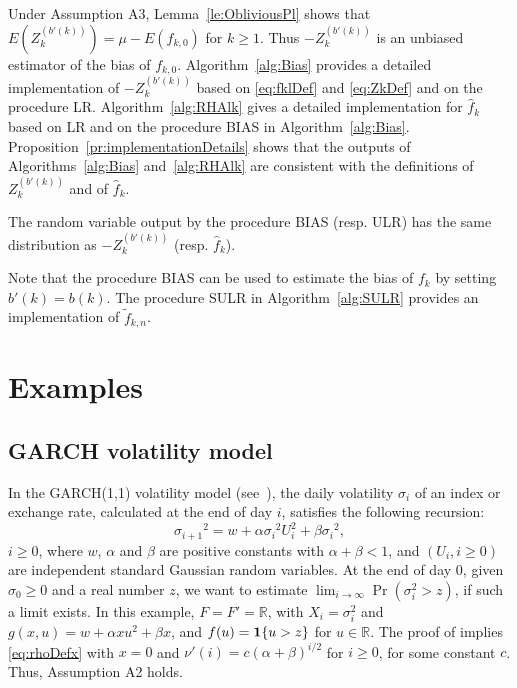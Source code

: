 \documentclass[a4paper,11pt]{article}
\begin{document}
Under Assumption A3, Lemma~\ref{le:ObliviousPl} shows that   \(E(Z_{k}^{(b'(k))})=\mu-E(f_{k,0})\) for  \(k\geq1\). Thus \(-Z_{k}^{(b'(k))}\) is an unbiased estimator of the bias of \(f_{k,0}\).  Algorithm~\ref{alg:Bias}   
provides a detailed implementation of \(-Z_{k}^{(b'(k))}\) based on \eqref{eq:fklDef} and \eqref{eq:ZkDef} and on  the procedure LR. Algorithm~\ref{alg:RHAlk} gives a detailed implementation for  \(\hat f_{k}\) based on LR and on the procedure BIAS in  Algorithm~\ref{alg:Bias}.   Proposition~\ref{pr:implementationDetails} shows that  the outputs of Algorithms~\ref{alg:Bias}   
 and~\ref{alg:RHAlk} are consistent with the definitions of \(Z_{k}^{(b'(k))}\) and of  \(\hat f_{k}\).     
\begin{proposition}\label{pr:implementationDetails}The random variable output by the procedure BIAS (resp. ULR) has the same distribution as  \(-Z_{k}^{(b'(k))}\) (resp. \(\hat f_{k}\)).  
\end{proposition}
Note that the procedure BIAS can be used to estimate the bias of \(f_{k}\) by setting \(b'(k)=b(k)\). The procedure SULR in Algorithm~\ref{alg:SULR} provides an implementation of \(\tilde f_{k,n}\).

\section{Examples}\label{se:examples}
\subsection{GARCH volatility model}\label{sub:GARCH}
In the  GARCH(1,1) volatility model (see~\citep[Ch. 23]{Hull14}), the daily volatility  \(\sigma_{i}\)  of an index or exchange rate, calculated at the end of day  \(i\), satisfies the following recursion:
\begin{equation*}
{\sigma_{i+1}}^{2}= w +\alpha{\sigma_{i}}^{2}U_{i}^{2}+\beta {\sigma_{i}}^{2},
\end{equation*}
 \(i\geq0\), where \( w \), \(\alpha\) and \(\beta\) are positive constants with \(\alpha+\beta<1\), and \((U_{i}, i\geq0)\) are independent standard Gaussian random variables.  At the end of day \(0\), given  \(\sigma_{0}\geq0\) and a real number \(z\), we want to estimate \(\lim_{i\rightarrow\infty}\Pr(\sigma_{i}^{2}> z)\), if such a limit exists. In this example, \(F=F'=\mathbb{R}\), with \(X_{i}=\sigma_{i}^{2}\) and \(g(x,u)=w +\alpha xu^{2}+\beta x\), and   \(f(u)={\bf1}\{u> z\}\) for \(u\in\mathbb{R}\). The proof of \cite[Proposition 9]{kahaRandomizedDimensionReduction20} implies \eqref{eq:rhoDefx} with \(x=0\) and 
\(\nu'(i)= c(\alpha+\beta)^{i/2}\) for \(i\geq0\), for some constant \(c\). Thus,
 Assumption A2 holds. 
\end{document}
